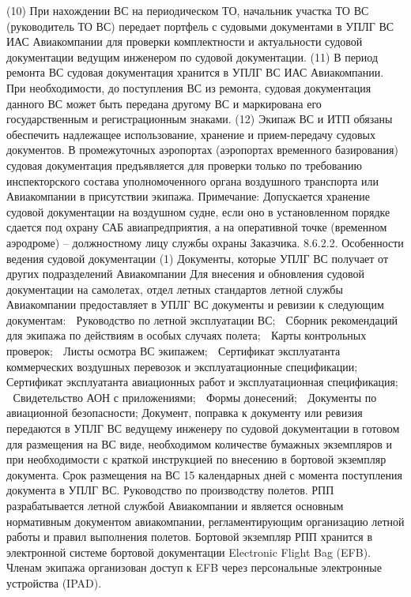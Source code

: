 (10) При нахождении ВС на периодическом ТО, начальник участка ТО ВС (руководитель ТО ВС) передает портфель с судовыми документами в УПЛГ ВС ИАС Авиакомпании для проверки комплектности и актуальности судовой документации ведущим инженером по судовой документации.
(11) В период ремонта ВС судовая документация хранится в УПЛГ ВС ИАС Авиакомпании. При необходимости, до поступления ВС из ремонта, судовая документация данного ВС может быть передана другому ВС и маркирована его государственным и регистрационным знаками.  
 (12)	Экипаж ВС и ИТП обязаны обеспечить надлежащее использование, хранение и прием-передачу судовых документов. 
В промежуточных аэропортах (аэропортах временного базирования) судовая документация предъявляется для проверки только по требованию инспекторского состава уполномоченного органа воздушного транспорта или Авиакомпании в присутствии экипажа. 
Примечание: Допускается хранение судовой документации на воздушном судне, если оно в установленном порядке сдается под охрану САБ авиапредприятия, а на оперативной точке (временном аэродроме) – должностному лицу службы охраны Заказчика.
8.6.2.2. Особенности ведения судовой документации
(1) Документы, которые УПЛГ ВС получает от других подразделений Авиакомпании
Для внесения и обновления судовой документации на самолетах, отдел летных стандартов летной службы Авиакомпании предоставляет в УПЛГ ВС документы и ревизии к следующим документам:
	Руководство по летной эксплуатации ВС;
	Сборник рекомендаций для экипажа по действиям в особых случаях полета;
	Карты контрольных проверок; 
	Листы осмотра ВС экипажем;
	Сертификат эксплуатанта коммерческих воздушных перевозок и эксплуатационные спецификации;
	Сертификат эксплуатанта авиационных работ и эксплуатационная спецификация;
	Свидетельство АОН с приложениями;
	Формы донесений;
	Документы по авиационной безопасности;
Документ, поправка к документу или ревизия передаются в УПЛГ ВС ведущему инженеру по судовой документации в готовом для размещения на ВС виде, необходимом количестве бумажных экземпляров и при необходимости с краткой инструкцией по внесению в бортовой экземпляр документа. Срок размещения на ВС 15 календарных дней с момента поступления документа в УПЛГ ВС.
Руководство по производству полетов. 
РПП разрабатывается летной службой Авиакомпании и является основным нормативным документом авиакомпании, регламентирующим организацию летной работы и правил выполнения полетов.
Бортовой экземпляр РПП хранится в электронной системе бортовой документации Electronic Flight Bag (EFB). Членам экипажа организован доступ к EFB через персональные электронные устройства (IPAD). 

